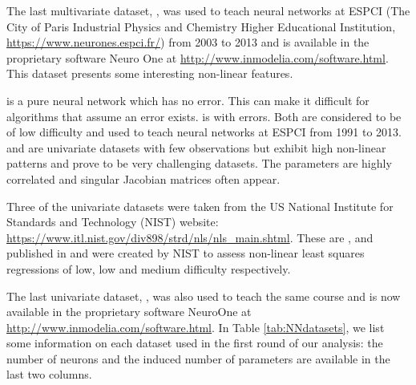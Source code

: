 The last multivariate dataset, , was used to teach neural
networks at ESPCI (The City of Paris Industrial Physics and Chemistry
Higher Educational Institution, \url{https://www.neurones.espci.fr/})
from 2003 to 2013 and is available in the proprietary software Neuro One
at \url{http://www.inmodelia.com/software.html}. This dataset presents
some interesting non-linear features.

 is a pure neural network which has no error. This can
make it difficult for algorithms that assume an error exists.
 is  with errors. Both are considered to
be of low difficulty and used to teach neural networks at ESPCI from
1991 to 2013.  and  are univariate datasets
with few observations but exhibit high non-linear patterns and prove to
be very challenging datasets. The parameters are highly correlated and
singular Jacobian matrices often appear.

Three of the univariate datasets were taken from the US National
Institute for Standards and Technology (NIST) website:
\url{https://www.itl.nist.gov/div898/strd/nls/nls_main.shtml}. These are
,  and  published in
\citep[resp.]{rustnist96:Gauss1,rustnist96:Gauss2,rustnist96:Gauss3} and
were created by NIST to assess non-linear least squares regressions of
low, low and medium difficulty respectively.

The last univariate dataset, , was also used to teach
the same course and is now available in the proprietary software
NeuroOne at \url{http://www.inmodelia.com/software.html}. In Table
\ref{tab:NNdatasets}, we list some information on each dataset used in
the first round of our analysis: the number of neurons and the induced
number of parameters are available in the last two columns.

